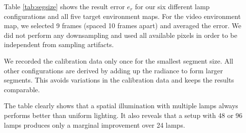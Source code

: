   Table \ref{tab:segsize} shows the result error $e_r$ for our six different lamp configurations and all five target environment maps.
  For the video environment map, we selected 9 frames (spaced 10 frames apart) and averaged the error.
  We did not perform any downsampling and used all available pixels in order to be independent from sampling artifacts.

  We recorded the calibration data only once for the smallest segment size. 
  All other configurations are derived by adding up the radiance to form larger segments.
  This avoids variations in the calibration data and keeps the results comparable.
  
  The table clearly shows that a spatial illumination with multiple lamps always performs better than uniform lighting.
  It also reveals that a setup with 48 or 96 lamps produces only a marginal improvement over 24 lamps.   
   
